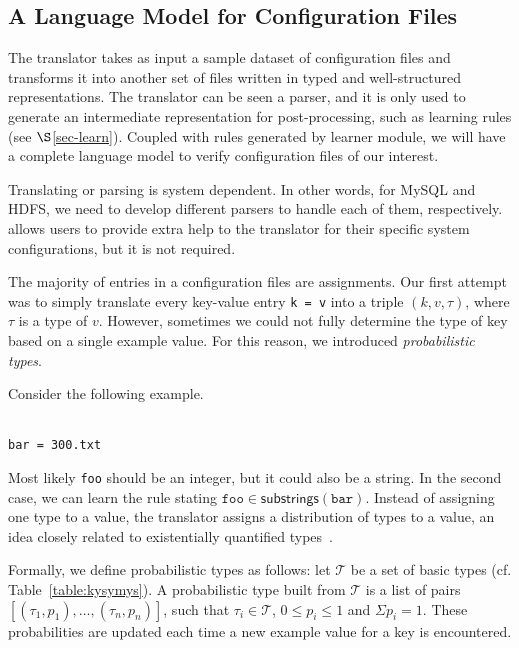 \subsection{A Language Model for Configuration Files}
\label{sec:lang}



The translator takes as input a sample dataset of configuration files and transforms it into another set of files written in
typed and well-structured representations.
The translator can be seen a parser, and it is only
used to generate an intermediate representation for post-processing, 
such as learning rules (see $\S$\ref{sec-learn}).
Coupled with rules generated by learner module,
we will have a complete language model to verify configuration files
of our interest.

Translating or parsing is system dependent. In other words, for MySQL
and HDFS, we need to develop different parsers to handle each of them,
respectively. \app allows users to 
provide extra help to the translator
for their specific system configurations,
but it is not required.

The majority of entries in a configuration files are assignments. Our first attempt was to simply
translate every key-value entry {\tt {k = v}} into a triple $(k, v, \tau)$, where $\tau$ is a type of 
$v$. However, sometimes we could not fully determine the type of key 
based on a single example value. For this reason, we introduced {\emph {probabilistic types}}.

Consider the following example.

\\
{\tt {bar = 300.txt}}

Most likely {\tt foo} should be an integer, but it could also be a string.
In the second case, we can learn the rule stating 
$ \texttt{foo} \in \textsf{substrings}(\texttt{bar})$. 
Instead of assigning one type to a value, the translator assigns a distribution of types 
to a value, an idea closely related to existentially quantified 
types~\cite{Launchbury93lazyfunctional}. 

Formally, we define probabilistic types as follows: let $\mathcal{T}$ be a set of basic types (cf. Table~\ref{table:kysymys}).
A probabilistic type built from $\mathcal{T}$ is a list of pairs 
$[(\tau_1, p_1),\ldots,(\tau_n, p_n)]$,
such that $\tau_i \in \mathcal{T}$, $0 \le p_i \le 1$ 
and $\Sigma p_i = 1$. 
These probabilities are updated each time a new example value 
for a key is encountered.

